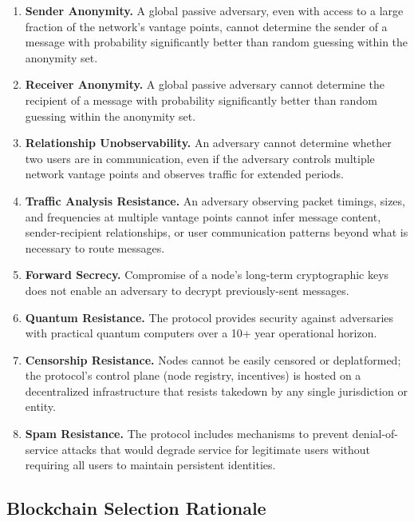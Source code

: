 \documentclass[11pt]{article}
\theoremstyle{definition}
\theoremstyle{remark}
\begin{document}
\begin{enumerate}
    \item \textbf{Sender Anonymity.} A global passive adversary, even with access to a large fraction of the network's vantage points, cannot determine the sender of a message with probability significantly better than random guessing within the anonymity set.

    \item \textbf{Receiver Anonymity.} A global passive adversary cannot determine the recipient of a message with probability significantly better than random guessing within the anonymity set.

    \item \textbf{Relationship Unobservability.} An adversary cannot determine whether two users are in communication, even if the adversary controls multiple network vantage points and observes traffic for extended periods.

    \item \textbf{Traffic Analysis Resistance.} An adversary observing packet timings, sizes, and frequencies at multiple vantage points cannot infer message content, sender-recipient relationships, or user communication patterns beyond what is necessary to route messages.

    \item \textbf{Forward Secrecy.} Compromise of a node's long-term cryptographic keys does not enable an adversary to decrypt previously-sent messages.

    \item \textbf{Quantum Resistance.} The protocol provides security against adversaries with practical quantum computers over a 10+ year operational horizon.

    \item \textbf{Censorship Resistance.} Nodes cannot be easily censored or deplatformed; the protocol's control plane (node registry, incentives) is hosted on a decentralized infrastructure that resists takedown by any single jurisdiction or entity.

    \item \textbf{Spam Resistance.} The protocol includes mechanisms to prevent denial-of-service attacks that would degrade service for legitimate users without requiring all users to maintain persistent identities.
\end{enumerate}

\subsection{Blockchain Selection Rationale}
\end{document}
